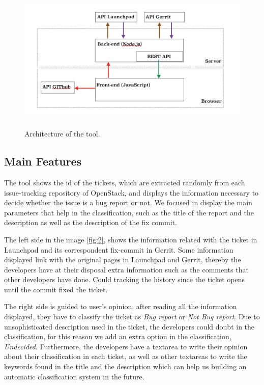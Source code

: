 \documentclass[ifip]{svmult}
\begin{document}
\label{sec:2.1}
\begin{figure}
\centering
\includegraphics[height=7cm]{Arquitectura.png}
\caption{Architecture of the tool.}
\label{fig:1}       %
\end{figure}

\subsection{Main Features}
\label{sec:2.2}
The tool shows the id of the tickets, which are extracted randomly from each issue-tracking repository of OpenStack, and displays the information necessary to decide whether the issue is a bug report or not. We focused in display the main parameters that help in the classification, such as the title of the report and the description as well as the description of the fix commit. 

The left side in the image \ref{fig:2}, shows the information related with the ticket in Launchpad and its correspondent fix-commit in Gerrit. Some information displayed link with the original pages in Launchpad and Gerrit, thereby the  developers have at their disposal extra information such as the comments that other developers have done. Could tracking the history since the ticket opens until the commit fixed the ticket.

The right side is guided to user's opinion, after reading all the information displayed, they have to classify the ticket as \textit{Bug report} or \textit{Not Bug report}. Due to unsophisticated description used in the ticket, the developers could doubt in the classification, for this reason we add an extra option in the classification, \textit{Undecided}. Furthermore, the developers have a textarea to write their opinion about their classification in each ticket, as well as other textareas to write the keywords found in the title and the description which can help us building an automatic classification system in the future.
\end{document}
